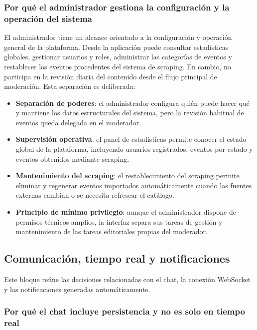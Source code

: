 \subsubsection{Por qué el administrador gestiona la configuración y la operación del sistema}

El administrador tiene un alcance orientado a la configuración y operación general de la plataforma. Desde la aplicación puede consultar estadísticas globales, gestionar usuarios y roles, administrar las categorías de eventos y restablecer los eventos procedentes del sistema de scraping. En cambio, no participa en la revisión diaria del contenido desde el flujo principal de moderación. Esta separación es deliberada:

\begin{itemize}
    \item \textbf{Separación de poderes}: el administrador configura quién puede hacer qué y mantiene los datos estructurales del sistema, pero la revisión habitual de eventos queda delegada en el moderador.
    \item \textbf{Supervisión operativa}: el panel de estadísticas permite conocer el estado global de la plataforma, incluyendo usuarios registrados, eventos por estado y eventos obtenidos mediante scraping.
    \item \textbf{Mantenimiento del scraping}: el restablecimiento del scraping permite eliminar y regenerar eventos importados automáticamente cuando las fuentes externas cambian o se necesita refrescar el catálogo.
    \item \textbf{Principio de mínimo privilegio}: aunque el administrador dispone de permisos técnicos amplios, la interfaz separa sus tareas de gestión y mantenimiento de las tareas editoriales propias del moderador.
\end{itemize}

\subsection{Comunicación, tiempo real y notificaciones}

Este bloque reúne las decisiones relacionadas con el chat, la conexión WebSocket y las notificaciones generadas automáticamente.

\subsubsection{Por qué el chat incluye persistencia y no es solo en tiempo real}

